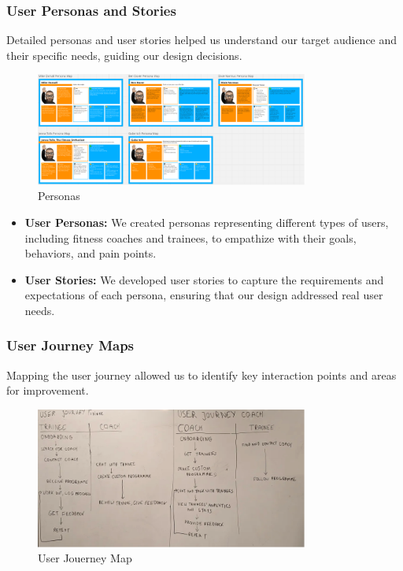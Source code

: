 \subsubsection{User Personas and Stories}
Detailed personas and user stories helped us understand our target audience and their specific needs, guiding our design decisions.
\begin{figure}[H]
    \centering
    \includegraphics[width=0.8\textwidth]{images/personas.png}
    \caption{Personas}
    \label{fig:example_image}
  \end{figure}


\begin{itemize}
  \item \textbf{User Personas:} We created personas representing different types of users, including fitness coaches and trainees, to empathize with their goals, behaviors, and pain points.
  
  \item \textbf{User Stories:} We developed user stories to capture the requirements and expectations of each persona, ensuring that our design addressed real user needs.
\end{itemize}


\subsubsection{User Journey Maps}
Mapping the user journey allowed us to identify key interaction points and areas for improvement.

\begin{figure}[H]
    \centering
    \includegraphics[width=0.8\textwidth]{images/userjourney.png}
    \caption{User Jouerney Map}
    \label{fig:userjourney}
  \end{figure}


